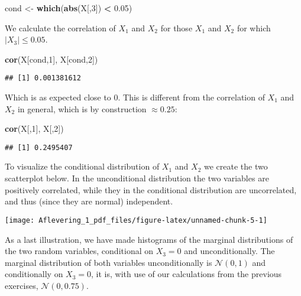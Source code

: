 \documentclass[
]{article}
\newenvironment{Shaded}{\begin{snugshade}}{\end{snugshade}}
\newcommand{\DecValTok}[1]{\textcolor[rgb]{0.00,0.00,0.81}{#1}}
\newcommand{\FloatTok}[1]{\textcolor[rgb]{0.00,0.00,0.81}{#1}}
\newcommand{\FunctionTok}[1]{\textcolor[rgb]{0.13,0.29,0.53}{\textbf{#1}}}
\newcommand{\NormalTok}[1]{#1}
\newcommand{\OtherTok}[1]{\textcolor[rgb]{0.56,0.35,0.01}{#1}}
\newcommand{\SpecialCharTok}[1]{\textcolor[rgb]{0.81,0.36,0.00}{\textbf{#1}}}
\begin{document}
\begin{Shaded}
\begin{Highlighting}[]
\NormalTok{cond }\OtherTok{\textless{}{-}} \FunctionTok{which}\NormalTok{(}\FunctionTok{abs}\NormalTok{(X[,}\DecValTok{3}\NormalTok{]) }\SpecialCharTok{\textless{}} \FloatTok{0.05}\NormalTok{)}
\end{Highlighting}
\end{Shaded}

We calculate the correlation of \(X_1\) and \(X_2\) for those \(X_1\)
and \(X_2\) for which \(|X_3| \leq 0.05\).

\begin{Shaded}
\begin{Highlighting}[]
\FunctionTok{cor}\NormalTok{(X[cond,}\DecValTok{1}\NormalTok{], X[cond,}\DecValTok{2}\NormalTok{])}
\end{Highlighting}
\end{Shaded}

\begin{verbatim}
## [1] 0.001381612
\end{verbatim}

Which is as expected close to \(0\). This is different from the
correlation of \(X_1\) and \(X_2\) in general, which is by construction
\(\approx 0.25\):

\begin{Shaded}
\begin{Highlighting}[]
\FunctionTok{cor}\NormalTok{(X[,}\DecValTok{1}\NormalTok{], X[,}\DecValTok{2}\NormalTok{])}
\end{Highlighting}
\end{Shaded}

\begin{verbatim}
## [1] 0.2495407
\end{verbatim}

To visualize the conditional distribution of \(X_1\) and \(X_2\) we
create the two scatterplot below. In the unconditional distribution the
two variables are positively correlated, while they in the conditional
distribution are uncorrelated, and thus (since they are normal)
independent.

\begin{center}\texttt{[image: Aflevering\_1\_pdf\_files/figure-latex/unnamed-chunk-5-1]} \end{center}

As a last illustration, we have made histograms of the marginal
distributions of the two random variables, conditional on \(X_3 = 0\)
and unconditionally. The marginal distribution of both variables
unconditionally is \(\mathcal{N}(0,1)\) and conditionally on
\(X_3 = 0\), it is, with use of our calculations from the previous
exercises, \(\mathcal{N}(0, 0.75)\).
\end{document}
